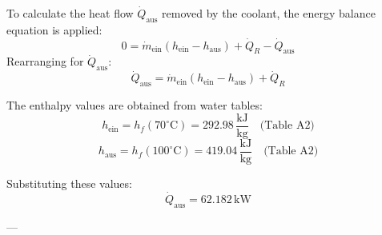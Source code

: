 To calculate the heat flow \( \dot{Q}_{\text{aus}} \) removed by the coolant, the energy balance equation is applied:  
\[
0 = \dot{m}_{\text{ein}} \left( h_{\text{ein}} - h_{\text{aus}} \right) + \dot{Q}_R - \dot{Q}_{\text{aus}}
\]  
Rearranging for \( \dot{Q}_{\text{aus}} \):  
\[
\dot{Q}_{\text{aus}} = \dot{m}_{\text{ein}} \left( h_{\text{ein}} - h_{\text{aus}} \right) + \dot{Q}_R
\]  

The enthalpy values are obtained from water tables:  
\[
h_{\text{ein}} = h_f(70^\circ\text{C}) = 292.98 \, \frac{\text{kJ}}{\text{kg}} \quad \text{(Table A2)}
\]  
\[
h_{\text{aus}} = h_f(100^\circ\text{C}) = 419.04 \, \frac{\text{kJ}}{\text{kg}} \quad \text{(Table A2)}
\]  

Substituting these values:  
\[
\dot{Q}_{\text{aus}} = 62.182 \, \text{kW}
\]  

---